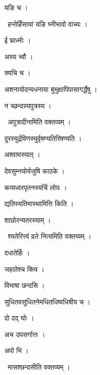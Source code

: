 \documentclass[10pt, openany, oneside]{book}
\begin{document}
\noindent यङि च ।

\par\noindent\hspace{1.5em}{\vps वा॰}~{\qt हन्तेर्हिंसायां यङि घ्नीभावो वाच्यः ।}

\noindent ई घ्राध्मोः ।

\noindent अस्य च्वौ ।

\noindent क्यचि च ।

\noindent अशनायोदन्यधनाया बुभुक्षापिपासागर्द्धेषु ।

\noindent न च्छन्दस्यपुत्रस्य ।

\par\noindent\hspace{1.5em}{\vps वा॰}~{\qt अपुत्रादीनामिति वक्तव्यम् ।}

\noindent दुरस्युर्द्रविणस्युर्वृषण्यतिरिषण्यति ।

\noindent अश्वाघस्यात् ।

\noindent देवसुम्नयोर्यजुषि काठके ।

\noindent कव्यध्वरपृतनस्यर्चि लोपः ।

\noindent द्यतिस्यतिमास्थामित्ति किति ।

\noindent शाछोरन्यतरस्याम् ।

\par\noindent\hspace{1.5em}{\vps वा॰}~{\qt श्यतेरित्त्वं व्रते नित्यमिति वक्तव्यम् ।}

\noindent दधातेर्हिः ।

\noindent जहातेश्च क्त्वि ।

\noindent विभाषा छन्दसि ।

\noindent सुधितवसुधितनेमधितधिष्वधिषीय च ।

\noindent दो दद् घोः ।

\noindent अच उपसर्गात्तः ।

\noindent अपो भि ।

\par\noindent\hspace{1.5em}{\vps वा॰}~{\qt मासश्छन्दसीति वक्तव्यम् ।}
\end{document}
